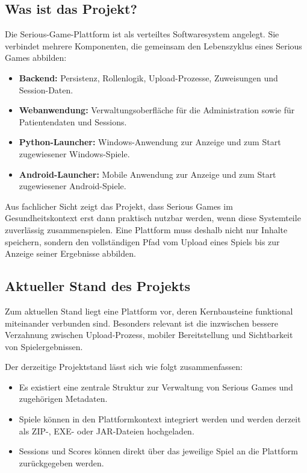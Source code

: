 \documentclass[a4paper,10pt,ngerman]{INSOproject}
\begin{document}
\subsection{Was ist das Projekt?}
Die Serious-Game-Plattform ist als verteiltes Softwaresystem angelegt. Sie verbindet mehrere Komponenten, die gemeinsam den Lebenszyklus eines Serious Games abbilden:

\begin{itemize}
  \item \textbf{Backend:} Persistenz, Rollenlogik, Upload-Prozesse, Zuweisungen und Session-Daten.
  \item \textbf{Webanwendung:} Verwaltungsoberfläche für die Administration sowie für Patientendaten und Sessions.
  \item \textbf{Python-Launcher:} Windows-Anwendung zur Anzeige und zum Start zugewiesener Windows-Spiele.
  \item \textbf{Android-Launcher:} Mobile Anwendung zur Anzeige und zum Start zugewiesener Android-Spiele.
\end{itemize}

Aus fachlicher Sicht zeigt das Projekt, dass Serious Games im Gesundheitskontext erst dann praktisch nutzbar werden, wenn diese Systemteile zuverlässig zusammenspielen. Eine Plattform muss deshalb nicht nur Inhalte speichern, sondern den vollständigen Pfad vom Upload eines Spiels bis zur Anzeige seiner Ergebnisse abbilden.

\subsection{Aktueller Stand des Projekts}
Zum aktuellen Stand liegt eine Plattform vor, deren Kernbausteine funktional miteinander verbunden sind. Besonders relevant ist die inzwischen bessere Verzahnung zwischen Upload-Prozess, mobiler Bereitstellung und Sichtbarkeit von Spielergebnissen.

Der derzeitige Projektstand lässt sich wie folgt zusammenfassen:

\begin{itemize}
  \item Es existiert eine zentrale Struktur zur Verwaltung von Serious Games und zugehörigen Metadaten.
  \item Spiele können in den Plattformkontext integriert werden und werden derzeit als ZIP-, EXE- oder JAR-Dateien hochgeladen.
  \item Sessions und Scores können direkt über das jeweilige Spiel an die Plattform zurückgegeben werden.
\end{itemize}
\end{document}
